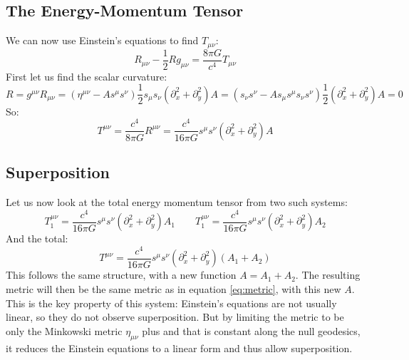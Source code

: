 \documentclass{article}
\begin{document}
\subsection{The Energy-Momentum Tensor}
We can now use Einstein's equations to find $T_{\mu\nu}$:
\begin{equation}
    R_{\mu\nu} - \frac{1}{2}R g_{\mu\nu} = \frac{8\pi G}{c^4}T_{\mu\nu}
\end{equation}
First let us find the scalar curvature:
\begin{equation}
    R = g^{\mu\nu} R_{\mu\nu} =
    \left(\eta^{\mu\nu} - A s^\mu s^\nu\right)\frac{1}{2}s_\mu s_\nu \left(\partial_x^2 + \partial_y^2\right) A = \left(s_\nu s^\nu - A s_\mu s^\mu s_\nu s^\nu\right)\frac{1}{2} \left(\partial_x^2 + \partial_y^2\right) A = 0
\end{equation}
So:
\begin{equation}
\label{eq:energy-momentum}
    T^{\mu\nu} = \frac{c^4}{8 \pi G} R^{\mu\nu} = \frac{c^4}{16 \pi G}s^\mu s^\nu \left(\partial_x^2 + \partial_y^2\right) A
\end{equation}

\subsection{Superposition}
Let us now look at the total energy momentum tensor from two such systems:
\begin{equation}
    T_{1}^{\mu\nu} = \frac{c^4}{16 \pi G}s^\mu s^\nu \left(\partial_x^2 + \partial_y^2\right) A_1
    \qquad
    T_{1}^{\mu\nu} = \frac{c^4}{16 \pi G}s^\mu s^\nu \left(\partial_x^2 + \partial_y^2\right) A_2
\end{equation}
And the total:
\begin{equation}
    T^{\mu\nu} = \frac{c^4}{16 \pi G}s^\mu s^\nu \left(\partial_x^2 + \partial_y^2\right) (A_1 + A_2)
\end{equation}
This follows the same structure, with a new function $A = A_1 + A_2$. The resulting metric will then be the same metric as in equation \ref{eq:metric}, with this new $A$.
\newline
This is the key property of this system: Einstein's equations are not usually linear, so they do not observe superposition. But by limiting the metric to be only the Minkowski metric $\eta_{\mu\nu}$ plus and that is constant along the null geodesics, it reduces the Einstein equations to a linear form and thus allow superposition.
\end{document}
